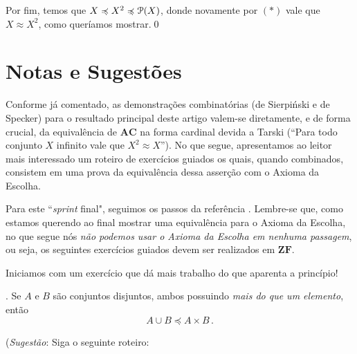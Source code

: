 \documentclass{hipatia}
\newcommand{\n}{\noindent}
\newcommand{\equip}{\approx}
\newcommand{\partes}[1]{\mathcal{P}(#1)}
\newcommand{\nback}[1][-.95pt]{
  \mathrel{\raisebox{#1}{$\rotatebox[origin=c]{-315}{\scaleobj{0.55}{-}}$}}
}
\newcommand{\preccurlyneq}{%
\mathrel{\ooalign{$\preccurlyeq$\cr\kern1.2pt$\nback$}}}
\newcommand{\ac}{\mathbf{AC}}
\newcommand{\zf}{\mathbf{ZF}}
\newcommand{\dominado}{\preccurlyeq}
\begin{document}
Por fim, temos que $X\preccurlyeq
X^2\preccurlyneq\partes{X}$, donde novamente por
$(\ast)$ vale que $X\approx X^2$, como queríamos
mostrar.\qed


\section{Notas e Sugestões}

Conforme já comentado, as demonstrações
combinatórias (de Sierpi\'nski e de Specker)  para
o resultado principal deste artigo valem-se
diretamente, e de forma crucial, da equivalência
de $\ac$ na forma cardinal devida a Tarski (``Para
todo conjunto  $X$ infinito vale que $X^2 \equip
X$''). No que segue, apresentamos ao leitor mais
interessado um roteiro de exercícios guiados os
quais, quando combinados, consistem em uma prova
da equivalência dessa asserção com o Axioma da
Escolha. 

Para este ``\emph{sprint} final", seguimos os
passos da referência \cite{JechAC}. Lembre-se que,
como estamos querendo ao final mostrar uma
equivalência para o Axioma da Escolha, no que
segue nós {\it não podemos usar o Axioma da
Escolha em nenhuma passagem}, ou seja, os
seguintes exercícios guiados devem ser realizados
em $\zf$.

Iniciamos com um exercício que dá mais trabalho do
que aparenta a princípio!

\n {\bf Exercício 0}. Se $A$ e $B$ são conjuntos
disjuntos, ambos possuindo {\it mais do que um
elemento}, então $$A \cup B \dominado A \times
B\,.$$

({\it Sugestão}: Siga o seguinte roteiro:
\end{document}
